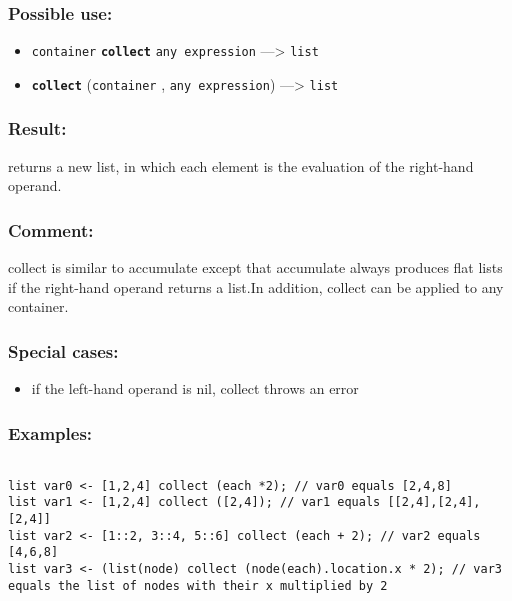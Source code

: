 \documentclass[]{book}
\providecommand{\tightlist}{%
  \setlength{\itemsep}{0pt}\setlength{\parskip}{0pt}}
\theoremstyle{definition}
\theoremstyle{definition}
\theoremstyle{definition}
\theoremstyle{remark}
\begin{document}
\subsubsection{Possible use:}\label{possible-use-90}

\begin{itemize}
\tightlist
\item
  \texttt{container} \textbf{\texttt{collect}} \texttt{any\ expression}
  ---\textgreater{} \texttt{list}
\item
  \textbf{\texttt{collect}} (\texttt{container} ,
  \texttt{any\ expression}) ---\textgreater{} \texttt{list}
\end{itemize}

\subsubsection{Result:}\label{result-88}

returns a new list, in which each element is the evaluation of the
right-hand operand.

\subsubsection{Comment:}\label{comment-21}

collect is similar to accumulate except that accumulate always produces
flat lists if the right-hand operand returns a list.In addition, collect
can be applied to any container.

\subsubsection{Special cases:}\label{special-cases-29}

\begin{itemize}
\tightlist
\item
  if the left-hand operand is nil, collect throws an error
\end{itemize}

\subsubsection{Examples:}\label{examples-69}

\begin{verbatim}
 
list var0 <- [1,2,4] collect (each *2); // var0 equals [2,4,8] 
list var1 <- [1,2,4] collect ([2,4]); // var1 equals [[2,4],[2,4],[2,4]] 
list var2 <- [1::2, 3::4, 5::6] collect (each + 2); // var2 equals [4,6,8] 
list var3 <- (list(node) collect (node(each).location.x * 2); // var3 equals the list of nodes with their x multiplied by 2
\end{verbatim}
\end{document}
